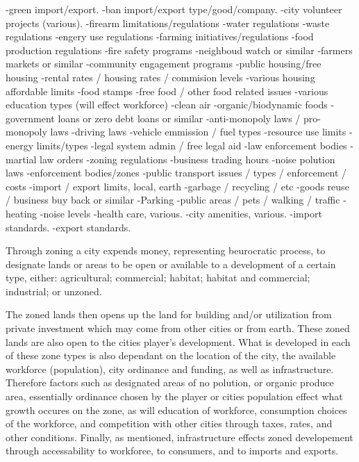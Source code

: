 
-green import/export.
-ban import/export type/good/company.
-city volunteer projects (various).
-firearm limitations/regulations
-water regulations
-waste regulations
-engery use regulations
-farming initiatives/regulations
-food production regulations
-fire safety programs
-neighboud watch or similar
-farmers markets or similar
-community engagement programs
-public housing/free housing
-rental rates / housing rates / commision levels
-various housing affordable limits
-food stamps
-free food / other food related issues
-various education types (will effect workforce)
-clean air
-organic/biodynamic foods
-government loans or zero debt loans or similar
-anti-monopoly laws / pro-monopoly laws
-driving laws
-vehicle emmission / fuel types 
-resource use limits
-energy limits/types
-legal system admin / free legal aid
-law enforcement bodies
-martial law orders
-zoning regulations
-business trading hours
-noise polution laws
-enforcement bodies/zones
-public transport issues / types / enforcement / costs
-import / export limits, local, earth
-garbage / recycling / etc
-goods reuse / business buy back or similar
-Parking
-public areas / pets / walking / traffic
-heating
-noise levels
-health care, various.
-city amenities, various.
-import standards.
-export standards.




Through zoning a city expends money, representing beurocratic process, to designate lands or areas to be open or available to a development of a certain type, either: agricultural; commercial; habitat; habitat and commercial; industrial; or unzoned.

The zoned lands then opens up the land for building and/or utilization from private investment which may come from other cities or from earth. These zoned lands are also open to the cities player's development. 
What is developed in each of these zone types is also dependant on the location of the city, the available workforce (population), city ordinance and funding, as well as infrastructure. Therefore factors such as designated areas of no polution, or organic produce area, essentially ordinance chosen by the player or cities population effect what growth occures on the zone, as will education of workforce, consumption choices of the workforce, and competition with other cities through taxes, rates, and other conditions. Finally, as mentioned, infrastructure effects zoned developement through accessability to workforce, to consumers, and to imports and exports.



